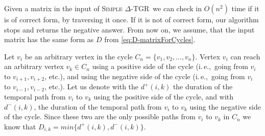\documentclass[11pt,a4paper]{article}
\theoremstyle{remark}
\theoremstyle{definition}
\newcommand{\ie}{i.\,e.,\ }
\newcommand{\deltaExact}{\textsc{Simple $\Delta$-TGR}}
\begin{document}
Given a matrix in the input of \deltaExact\ we can check in $O(n^2)$ time if it is of correct form, by traversing it once. If it is not of correct form, our algorithm stops and returns the negative answer.
From now on, we assume, that the input matrix has the same form as $D$ from \cref{eq:D-matrixForCycles}.

Let $v_i$ be an arbitrary vertex in the cycle $C_n =\{v_1, v_2, \dots, v_n\}$.
Vertex $v_i$ can reach an arbitrary vertex $v_k \in C_n$ using a positive side of the cycle (\ie going from $v_i$ to $v_{i+1},  v_{i+2}$, etc.), 
and using the negative side of the cycle (\ie going from $v_i$ to $v_{i-1}, v_{i-2}$, etc.).
Let us denote with the $d^+(i,k)$ the duration of the temporal path from $v_i$ to $v_k$ using the positive side of the cycle,
and with $d^-(i,k)$, the duration of the temporal path from $v_i$ to $v_k$ using the negative side of the cycle.
Since these two are the only possible paths from $v_i$ to $v_k$ in $C_n$ we know that $D_{i,k} = min \{d^+(i,k), d^-(i,k)\}$.
\end{document}
